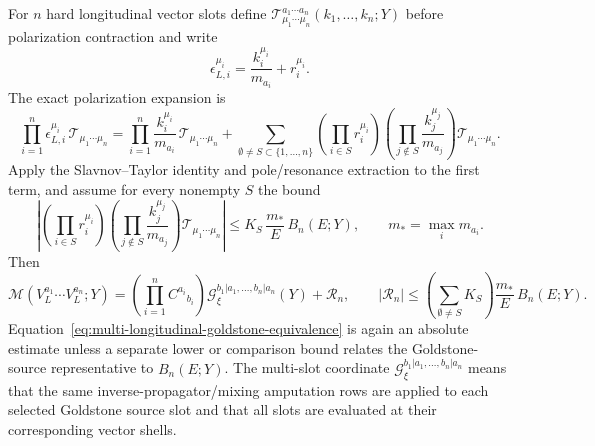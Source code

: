 \begin{controlledapproximation}
For \(n\) hard longitudinal vector slots define
\(\mathcal T_{\mu_1\cdots\mu_n}^{a_1\cdots a_n}(k_1,\ldots,k_n;Y)\) before
polarization contraction and write
\[
  \epsilon_{L,i}^{\mu_i}
  =
  \frac{k_i^{\mu_i}}{m_{a_i}}+r_i^{\mu_i}.
\]
The exact polarization expansion is
\begin{equation}
  \prod_{i=1}^n\epsilon_{L,i}^{\mu_i}\,
  \mathcal T_{\mu_1\cdots\mu_n}
  =
  \prod_{i=1}^n\frac{k_i^{\mu_i}}{m_{a_i}}\,
  \mathcal T_{\mu_1\cdots\mu_n}
  +
  \sum_{\emptyset\ne S\subset\{1,\ldots,n\}}
  \left(\prod_{i\in S}r_i^{\mu_i}\right)
  \left(\prod_{j\notin S}\frac{k_j^{\mu_j}}{m_{a_j}}\right)
  \mathcal T_{\mu_1\cdots\mu_n}.
  \label{eq:multi-longitudinal-remainder-expansion}
\end{equation}
Apply the Slavnov--Taylor identity and pole/resonance extraction to the first
term, and assume for every nonempty \(S\) the bound
\begin{equation}
  \left|
  \left(\prod_{i\in S}r_i^{\mu_i}\right)
  \left(\prod_{j\notin S}\frac{k_j^{\mu_j}}{m_{a_j}}\right)
  \mathcal T_{\mu_1\cdots\mu_n}
  \right|
  \le
  K_S\,\frac{m_\ast}{E}\,B_n(E;Y),
  \qquad m_\ast=\max_i m_{a_i}.
  \label{eq:multi-longitudinal-remainder-bound}
\end{equation}
Then
\begin{equation}
  \mathcal M(V_L^{a_1}\cdots V_L^{a_n};Y)
  =
  \left(\prod_{i=1}^n C^{a_i}{}_{b_i}\right)
  \mathcal G_\xi^{b_1|a_1,\ldots,b_n|a_n}(Y)
  +
  \mathcal R_n,
  \qquad
  |\mathcal R_n|
  \le
  \left(\sum_{\emptyset\ne S}K_S\right)
  \frac{m_\ast}{E}\,B_n(E;Y).
  \label{eq:multi-longitudinal-goldstone-equivalence}
\end{equation}
Equation~\eqref{eq:multi-longitudinal-goldstone-equivalence} is again an
absolute estimate unless a separate lower or comparison bound relates the
Goldstone-source representative to \(B_n(E;Y)\).  The multi-slot coordinate
\(\mathcal G_\xi^{b_1|a_1,\ldots,b_n|a_n}\) means that the same
inverse-propagator/mixing amputation rows are applied to each selected
Goldstone source slot and that all slots are evaluated at their corresponding
vector shells.
\end{controlledapproximation}

